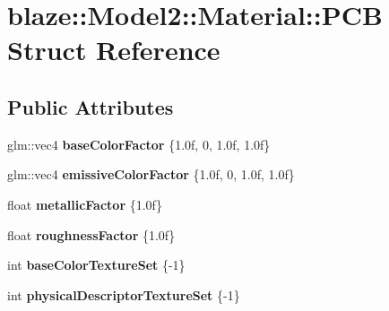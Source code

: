 \hypertarget{structblaze_1_1Model2_1_1Material_1_1PCB}{}\section{blaze\+:\+:Model2\+:\+:Material\+:\+:P\+CB Struct Reference}
\label{structblaze_1_1Model2_1_1Material_1_1PCB}
\subsection*{Public Attributes}
\begin{DoxyCompactItemize}
\item 
\mbox{\label{structblaze_1_1Model2_1_1Material_1_1PCB_a186d93254630e3011ccb4987ebfb074d}} 
glm\+::vec4 {\bfseries base\+Color\+Factor} \{1.\+0f, 0, 1.\+0f, 1.\+0f\}
\item 
\mbox{\label{structblaze_1_1Model2_1_1Material_1_1PCB_a6bd961d60bfe0c8c9cfbf5888eb6a8b8}} 
glm\+::vec4 {\bfseries emissive\+Color\+Factor} \{1.\+0f, 0, 1.\+0f, 1.\+0f\}
\item 
\mbox{\label{structblaze_1_1Model2_1_1Material_1_1PCB_a0bbda278a47afbc97eb454af9e3b75f6}} 
float {\bfseries metallic\+Factor} \{1.\+0f\}
\item 
\mbox{\label{structblaze_1_1Model2_1_1Material_1_1PCB_a24720893df9feeed709b41547a2c44f4}} 
float {\bfseries roughness\+Factor} \{1.\+0f\}
\item 
\mbox{\label{structblaze_1_1Model2_1_1Material_1_1PCB_a3c17f4812b264504a1082940704fd869}} 
int {\bfseries base\+Color\+Texture\+Set} \{-\/1\}
\item 
\mbox{\label{structblaze_1_1Model2_1_1Material_1_1PCB_ae9482f007ac0b2ddbbcc6bf6e7e10c1e}} 
int {\bfseries physical\+Descriptor\+Texture\+Set} \{-\/1\}
\item 
\mbox{\label{structblaze_1_1Model2_1_1Material_1_1PCB_a84c33c1d140a4a60001be3a08fce22f4}} 

\end{DoxyCompactItemize}
